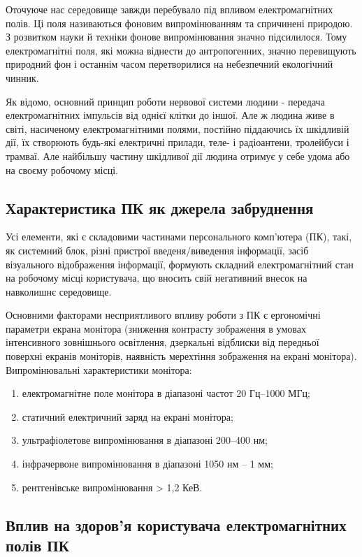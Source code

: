 Оточуюче нас середовище завжди перебувало під впливом електромагнітних полів. Ці поля називаються фоновим 
випромінюванням та спричинені природою. З розвитком науки й техніки фонове випромінювання значно підсилилося. 
Тому електромагнітні поля, які можна віднести до антропогенних, значно перевищують природний фон і останнім 
часом перетворилися на небезпечний екологічний чинник.

Як відомо, основний принцип роботи нервової системи людини - передача електромагнітних імпульсів від однієї
 клітки до іншої. Але ж людина живе в світі, насиченому електромагнітними полями, постійно піддаючись їх 
шкідливій дії, їх створюють будь-які електричні прилади, теле- і радіоантени, тролейбуси і трамваї. Але 
найбільшу частину шкідливої дії людина отримує у себе удома або на своєму робочому місці.

\subsection{Характеристика ПК як джерела забруднення}

Усі елементи, які є складовими частинами персонального комп’ютера (ПК), такі, як системний блок, різні 
пристрої введеня/виведення інформації, засіб візуального відображення інформації, формують складний 
електромагнітний стан на робочому місці користувача, що вносить свій негативний внесок на навколишнє 
середовище.

Основними факторами  несприятливого  впливу  роботи  з  ПК є ергономічні параметри екрана монітора 
(зниження   контрасту   зображення   в   умовах   інтенсивного   зовнішнього освітлення, дзеркальні 
відблиски від передньої поверхні екранів моніторів, наявність мерехтіння зображення на екрані монітора). 
Випромінювальні характеристики монітора:

\begin{enumerate}
\item електромагнітне поле монітора в діапазоні частот 20 Гц--1000 МГц;
\item статичний електричний заряд на екрані монітора;
\item ультрафіолетове випромінювання в діапазоні 200--400 нм;
\item інфрачервоне випромінювання в діапазоні 1050 нм -- 1 мм;
\item рентгенівське випромінювання > 1,2 КеВ.
\end{enumerate}


\subsection{Вплив на здоров'я користувача електромагнітних полів ПК}

